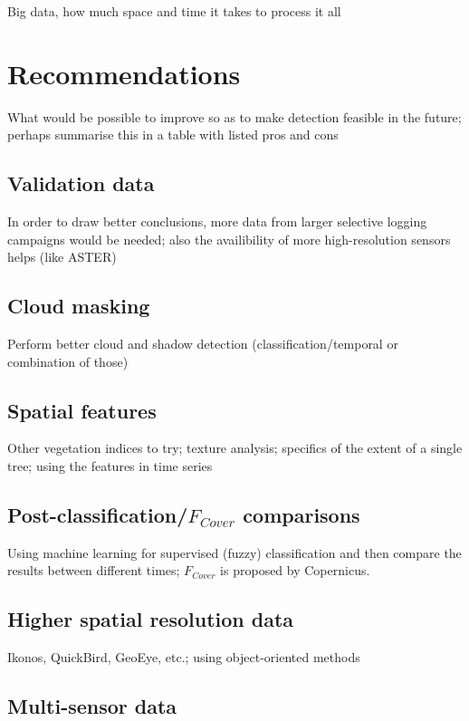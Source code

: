 \documentclass[a4paper,12pt]{scrbook}
\begin{document}
Big data, how much space and time it takes to process it all

\section{Recommendations}

What would be possible to improve so as to make detection feasible in the future; perhaps summarise this in a table with listed pros and cons

\subsection{Validation data}

In order to draw better conclusions, more data from larger selective logging campaigns would be needed; also the availibility of more high-resolution sensors helps (like ASTER)

\subsection{Cloud masking}

Perform better cloud and shadow detection (classification/temporal or combination of those)

\subsection{Spatial features}

Other vegetation indices to try; texture analysis; specifics of the extent of a single tree; using the features in time series

\subsection{Post-classification/$F_{Cover}$ comparisons}

Using machine learning for supervised (fuzzy) classification and then compare the results between different times; $F_{Cover}$ is proposed by Copernicus.

\subsection{Higher spatial resolution data}

Ikonos, QuickBird, GeoEye, etc.; using object-oriented methods

\subsection{Multi-sensor data}
\end{document}
